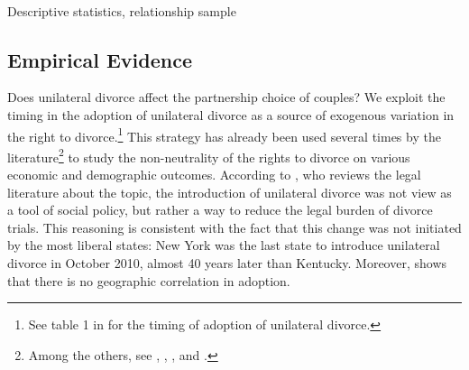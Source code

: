 \documentclass[12pt]{article}
\numberwithin{table}{section}
\begin{document}
\begin{table}[!htbp]\centering
	\caption{\\Descriptive statistics, relationship sample}
	\label{table:sum_coh}
	
\end{table}
\FloatBarrier

\subsection{Empirical Evidence}\label{empirics}
Does unilateral divorce affect the partnership choice of couples? We exploit the timing in the adoption of unilateral divorce as a source of exogenous variation in the right to divorce.\footnote{See table 1 in \cite{ciacci2017} for the timing of adoption of unilateral divorce.} This strategy has already been used several times by the literature\footnote{Among the others, see \cite{wolfers2006}, \cite{stevenson2008}, \cite{voena2015}, \cite{reynoso2019} and \cite{ciacci2017}.} to study the non-neutrality of the rights to divorce on various economic and demographic outcomes. According to \cite{gruber2004}, who reviews the legal literature about the topic, the introduction of unilateral divorce was not view as a tool of social policy, but rather a way to reduce the legal burden of divorce trials. This reasoning is consistent with the fact that this change was not initiated by the most liberal states: New York was the last state to introduce unilateral divorce in October 2010, almost 40 years later than Kentucky. Moreover, \cite{reynoso2019} shows that there is no geographic correlation in adoption. 
\end{document}
